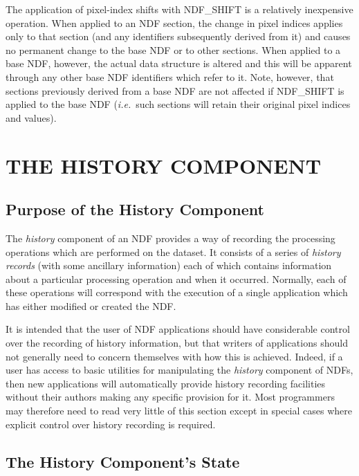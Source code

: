 \documentclass[twoside,11pt]{article}
\newcommand{\xlabel}[1]{}
\newcommand{\st}[1]{{\em{#1}}}
\begin{document}
The application of pixel-index shifts with NDF\_SHIFT is a relatively
inexpensive operation. 
When applied to an NDF section, the change in pixel indices applies only to
that section (and any identifiers subsequently derived from it) and causes
no permanent change to the base NDF or to other sections.
When applied to a base NDF, however, the actual data structure is altered and
this will be apparent through any other base NDF identifiers which refer to
it.
Note, however, that sections previously derived from a base NDF are not
affected if NDF\_SHIFT is applied to the base NDF (\st{i.e.}\ such sections
will retain their original pixel indices and values). 


\section{\xlabel{the_history_component}\label{ss:history}THE HISTORY COMPONENT}

\subsection{\xlabel{purpose_of_the_history_component}Purpose of the History Component}

The \st{history\/} component of an NDF provides a way of recording the
processing operations which are performed on the dataset.  It consists
of a series of \st{history records\/} (with some ancillary information)
each of which contains information about a particular processing
operation and when it occurred.  Normally, each of these operations
will correspond with the execution of a single application which has
either modified or created the NDF.

It is intended that the user of NDF applications should have
considerable control over the recording of history information, but
that writers of applications should not generally need to concern
themselves with how this is achieved.  Indeed, if a user has access to
basic utilities for manipulating the \st{history\/} component of NDFs,
then new applications will automatically provide history recording
facilities without their authors making any specific provision for it.
Most programmers may therefore need to read very little of this
section except in special cases where explicit control over history
recording is required.

\subsection{\xlabel{the_history_components_state}The History Component's State}
\end{document}
